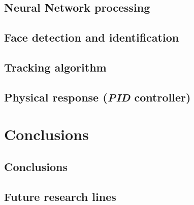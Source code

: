 \section{Neural Network processing}
\section{Face detection and identification}
\section{Tracking algorithm}
\section{Physical response (\emph{PID} controller)}



\chapter{Conclusions}
	\section{Conclusions}
	\section{Future research lines}